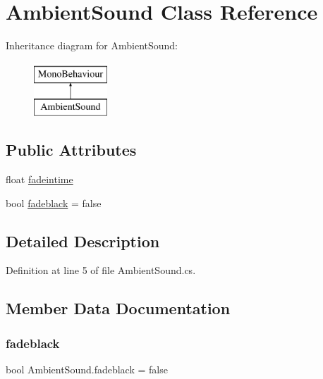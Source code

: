 \hypertarget{class_ambient_sound}{}\section{Ambient\+Sound Class Reference}
\label{class_ambient_sound}
Inheritance diagram for Ambient\+Sound\+:\begin{figure}[H]
\begin{center}
\leavevmode
\includegraphics[height=2.000000cm]{class_ambient_sound}
\end{center}
\end{figure}
\subsection*{Public Attributes}
\begin{DoxyCompactItemize}
\item 
float \mbox{\hyperlink{class_ambient_sound_a75dabb50536347e547f4f16f1b23e750}{fadeintime}}
\item 
bool \mbox{\hyperlink{class_ambient_sound_ae314e256e3b3d0c091e4634000296470}{fadeblack}} = false
\end{DoxyCompactItemize}


\subsection{Detailed Description}


Definition at line 5 of file Ambient\+Sound.\+cs.



\subsection{Member Data Documentation}
\mbox{\label{class_ambient_sound_ae314e256e3b3d0c091e4634000296470}} 
\subsubsection{\texorpdfstring{fadeblack}{fadeblack}}
{\footnotesize\ttfamily bool Ambient\+Sound.\+fadeblack = false}



